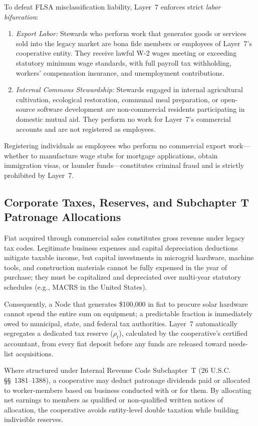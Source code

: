 To defeat FLSA misclassification liability, Layer~7 enforces strict \textit{labor bifurcation}:
\begin{enumerate}
  \item \textit{Export Labor:} Stewards who perform work that generates goods or services sold into the legacy market are bona fide members or employees of Layer~7's cooperative entity. They receive lawful W-2 wages meeting or exceeding statutory minimum wage standards, with full payroll tax withholding, workers' compensation insurance, and unemployment contributions.
  \item \textit{Internal Commons Stewardship:} Stewards engaged in internal agricultural cultivation, ecological restoration, communal meal preparation, or open-source software development are non-commercial residents participating in domestic mutual aid. They perform no work for Layer~7's commercial accounts and are not registered as employees.
\end{enumerate}
Registering individuals as employees who perform no commercial export work—whether to manufacture wage stubs for mortgage applications, obtain immigration visas, or launder funds—constitutes criminal fraud and is strictly prohibited by Layer~7.

\subsection{Corporate Taxes, Reserves, and Subchapter T Patronage Allocations}

Fiat acquired through commercial sales constitutes gross revenue under legacy tax codes. Legitimate business expenses and capital depreciation deductions mitigate taxable income, but capital investments in microgrid hardware, machine tools, and construction materials cannot be fully expensed in the year of purchase; they must be capitalized and depreciated over multi-year statutory schedules (e.g., MACRS in the United States). 

Consequently, a Node that generates \$100,000 in fiat to procure solar hardware cannot spend the entire sum on equipment; a predictable fraction is immediately owed to municipal, state, and federal tax authorities. Layer~7 automatically segregates a dedicated tax reserve ($\rho_t$), calculated by the cooperative's certified accountant, from every fiat deposit before any funds are released toward needs-list acquisitions.

Where structured under Internal Revenue Code Subchapter~T (26 U.S.C. \S\S~1381--1388), a cooperative may deduct patronage dividends paid or allocated to worker-members based on business conducted with or for them. By allocating net earnings to members as qualified or non-qualified written notices of allocation, the cooperative avoids entity-level double taxation while building indivisible reserves.

